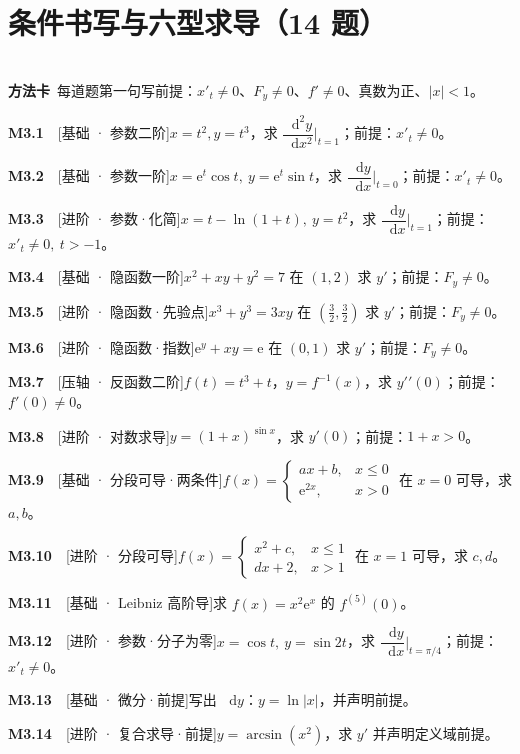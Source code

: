 \documentclass[11pt,a4paper]{ctexart}
\newcommand{\ee}{\mathrm{e}}
\newcommand{\dd}{\mathop{}\!\mathrm{d}}
\newcommand{\qi}[3]{\par\noindent\textbf{#1}\ \ {\footnotesize[#2]}\quad #3\par\smallskip}
\begin{document}
\section{条件书写与六型求导（14 题）}
\\[0.3em]
\noindent\textbf{方法卡}\ 每道题第一句写前提：$x\prime_t\ne0$、$F_y\ne0$、$f\prime\ne0$、真数为正、$|x|<1$。\\[0.5em]
\qi{M3.1}{基础 · 参数二阶}{$x=t^{2},y=t^{3}$，求 $\dfrac{\dd^{2}y}{\dd x^{2}}\big|_{t=1}$；前提：$x\prime_t\ne0$。}
\qi{M3.2}{基础 · 参数一阶}{$x=\ee^{t}\cos t,\ y=\ee^{t}\sin t$，求 $\dfrac{\dd y}{\dd x}\big|_{t=0}$；前提：$x\prime_t\ne0$。}
\qi{M3.3}{进阶 · 参数·化简}{$x=t-\ln(1+t),\ y=t^{2}$，求 $\dfrac{\dd y}{\dd x}\big|_{t=1}$；前提：$x\prime_t\ne0,\ t>-1$。}
\qi{M3.4}{基础 · 隐函数一阶}{$x^{2}+xy+y^{2}=7$ 在 $(1,2)$ 求 $y\prime$；前提：$F_y\ne0$。}
\qi{M3.5}{进阶 · 隐函数·先验点}{$x^{3}+y^{3}=3xy$ 在 $(\tfrac32,\tfrac32)$ 求 $y\prime$；前提：$F_y\ne0$。}
\qi{M3.6}{进阶 · 隐函数·指数}{$\ee^{y}+xy=\ee$ 在 $(0,1)$ 求 $y\prime$；前提：$F_y\ne0$。}
\qi{M3.7}{压轴 · 反函数二阶}{$f(t)=t^{3}+t$，$y=f^{-1}(x)$，求 $y\prime\prime(0)$；前提：$f\prime(0)\ne0$。}
\qi{M3.8}{进阶 · 对数求导}{$y=(1+x)^{\sin x}$，求 $y\prime(0)$；前提：$1+x>0$。}
\qi{M3.9}{基础 · 分段可导·两条件}{$f(x)=\begin{cases}ax+b,&x\le0\\ \ee^{2x},&x>0\end{cases}$ 在 $x=0$ 可导，求 $a,b$。}
\qi{M3.10}{进阶 · 分段可导}{$f(x)=\begin{cases}x^{2}+c,&x\le1\\ dx+2,&x>1\end{cases}$ 在 $x=1$ 可导，求 $c,d$。}
\qi{M3.11}{基础 · Leibniz 高阶导}{求 $f(x)=x^{2}\ee^{x}$ 的 $f^{(5)}(0)$。}
\qi{M3.12}{进阶 · 参数·分子为零}{$x=\cos t,\ y=\sin 2t$，求 $\dfrac{\dd y}{\dd x}\big|_{t=\pi/4}$；前提：$x\prime_t\ne0$。}
\qi{M3.13}{基础 · 微分·前提}{写出 $\dd y$：$y=\ln|x|$，并声明前提。}
\qi{M3.14}{进阶 · 复合求导·前提}{$y=\arcsin(x^{2})$，求 $y\prime$ 并声明定义域前提。}
\end{document}
